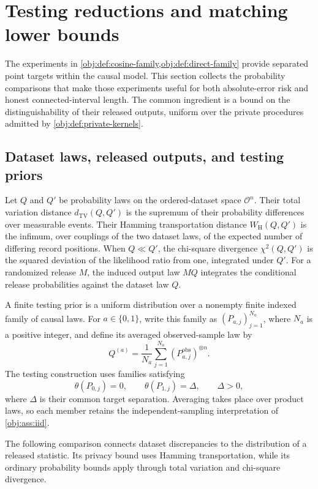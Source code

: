 \section{Testing reductions and matching lower bounds}

The experiments in \cref{obj:def:cosine-family,obj:def:direct-family} provide separated point targets within the causal model. This section collects the probability comparisons that make those experiments useful for both absolute-error risk and honest connected-interval length. The common ingredient is a bound on the distinguishability of their released outputs, uniform over the private procedures admitted by \cref{obj:def:private-kernels}.

\subsection{Dataset laws, released outputs, and testing priors}

Let \(Q\) and \(Q'\) be probability laws on the ordered-dataset space \(\mathcal O^n\). Their total variation distance \(d_{\mathrm{TV}}(Q,Q')\) is the supremum of their probability differences over measurable events. Their Hamming transportation distance \(W_{\mathrm H}(Q,Q')\) is the infimum, over couplings of the two dataset laws, of the expected number of differing record positions. When \(Q\ll Q'\), the chi-square divergence \(\chi^2(Q,Q')\) is the squared deviation of the likelihood ratio from one, integrated under \(Q'\). For a randomized release \(M\), the induced output law \(MQ\) integrates the conditional release probabilities against the dataset law \(Q\).

A finite testing prior is a uniform distribution over a nonempty finite indexed family of causal laws. For \(a\in\{0,1\}\), write this family as \((P_{a,j})_{j=1}^{N_a}\), where \(N_a\) is a positive integer, and define its averaged observed-sample law by
\[
Q^{(a)}
=
\frac{1}{N_a}\sum_{j=1}^{N_a}
(P_{a,j}^{\mathrm{obs}})^{\otimes n}.
\]
The testing construction uses families satisfying
\[
\theta(P_{0,j})=0,
\qquad
\theta(P_{1,j})=\Delta,
\qquad
\Delta>0,
\]
where \(\Delta\) is their common target separation. Averaging takes place over product laws, so each member retains the independent-sampling interpretation of \cref{obj:ass:iid}.

The following comparison connects dataset discrepancies to the distribution of a released statistic. Its privacy bound uses Hamming transportation, while its ordinary probability bounds apply through total variation and chi-square divergence.

